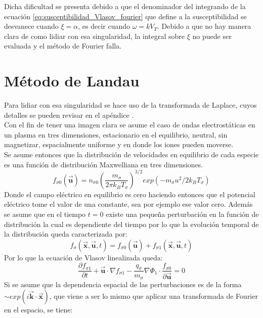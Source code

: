 \documentclass[../tesis_main_file.tex]{subfiles}
\begin{document}
Dicha dificultad se presenta debido a que el denominador del integrando de la ecuación \ref{eq:susceptibilidad_Vlasov_fourier} que define a la susceptibilidad se desvanece cuando $\xi=\alpha$, es decir cuando $\omega = kV_T$. Debido a que no hay manera clara de como lidiar con esa singularidad, la integral sobre $\xi$ no puede ser evaluada y el método de Fourier falla.
\section{Método de Landau}
Para lidiar con esa singularidad se hace uso de la transformada de Laplace, cuyos detalles se pueden revisar en el apéndice \notinsubfile{\ref{Ap:Laplace}}.\\
Con el fin de tener una imagen clara se asume el caso de ondas electrostáticas en un plasma en tres dimensiones, estacionario en el equilibrio, neutral, sin magnetizar, espacialmente uniforme y en donde los iones pueden moverse.\\
Se asume entonces que la distribución de velocidades en equilibrio de cada especie es una función de distribución Maxwelliana en tres dimensiones.
\begin{equation}
\label{eq:dist_max_3D}
f_{\sigma 0}(\overrightarrow{\textbf{u}})=n_{\sigma 0} \left(\frac{m_{\sigma}}{2\pi k_B T_{\sigma}}\right)^{3/2}exp(-m_{\sigma}u^2/2k_BT_{\sigma})
\end{equation}
Donde el campo eléctrico en equilibrio es cero haciendo entonces que el potencial eléctrico tome el valor de una constante, sea por ejemplo ese valor cero. Además se asume que en el tiempo $t=0$ existe una pequeña perturbación en la función de distribución la cual es dependiente del tiempo por lo que la evolución temporal de la distribución queda caracterizada por:
\begin{equation}
f_{\sigma}(\overrightarrow{\textbf{x}},\overrightarrow{\textbf{u}},t)=f_{\sigma 0}(\overrightarrow{\textbf{u}})+f_{\sigma 1}(\overrightarrow{\textbf{x}},\overrightarrow{\textbf{u}},t)
\end{equation}
Por lo que la ecuación de Vlasov linealizada queda:
\begin{equation}
\frac{\partial f_{\sigma 1}}{\partial t}+ \overrightarrow{\textbf{u}} \cdot \nabla f_{\sigma 1} -\frac{q_{\sigma}}{m_{\sigma}}\nabla \Phi _1 \cdot \frac{f_{\sigma 0}}{\partial  \overrightarrow{\textbf{u}}}=0
\end{equation}
Si se asume que la dependencia espacial de las perturbaciones es de la forma $\sim exp(i\overrightarrow{\textbf{k}}\cdot \overrightarrow{\textbf{x}})$, que viene a ser lo mismo que aplicar una transformada de Fourier en el espacio, se tiene:
\end{document}
